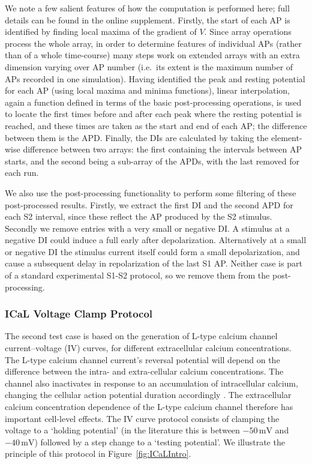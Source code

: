 \documentclass[preprint,authoryear,12pt]{elsarticle}
\newcommand{\vu}[2]{\ensuremath{#1\,\mathrm{#2}}}
\newcommand{\changed}[1]{#1}
\begin{document}
We note a few salient features of how the computation is performed here; full details can be found in the online supplement.
Firstly, the start of each AP is identified by finding local maxima of the gradient of $V$.
Since array operations process the whole array, in order to determine features of individual APs (rather than of a whole time-course) many steps work on extended arrays with an extra dimension varying over AP number (i.e.\ its extent is the maximum number of APs recorded in one simulation).
Having identified the peak and resting potential for each AP (using local maxima and minima functions), linear interpolation, again a function defined in terms of the basic post-processing operations, is used to locate the first times before and after each peak where the resting potential is reached, and these times are taken as the start and end of each AP; the difference between them is the APD.
Finally, the DIs are calculated by taking the element-wise difference between two arrays: the first containing the intervals between AP starts, and the second being a sub-array of the APDs, with the last removed for each run.


We also use the post-processing functionality to perform some filtering of these post-processed results.
Firstly, we extract the first DI and the second APD for each S2 interval, since these reflect the AP produced by the S2 stimulus.
\changed{Secondly we remove entries with a very small or negative DI.
A stimulus at a negative DI could induce a full early after depolarization.
Alternatively at a small or negative DI the stimulus current itself could form a small depolarization, and cause a subsequent delay in repolarization of the last S1 AP.
Neither case is part of a standard experimental S1-S2 protocol, so we remove them from the post-processing.}


\subsubsection{ICaL Voltage Clamp Protocol}
\label{sec:intro-ical}

The second test case is based on the generation of L-type calcium channel current--voltage (IV) curves, for different extracellular calcium concentrations.
The L-type calcium channel current's reversal potential will depend on the difference between the intra- and extra-cellular calcium concentrations.
The channel also inactivates in response to an accumulation of intracellular calcium, changing the cellular action potential duration accordingly \citep{grandi2009theoretical}.
The extracellular calcium concentration dependence of the L-type calcium channel therefore has important cell-level effects.
The IV curve protocol consists of clamping the voltage to a `holding potential' (in the literature this is between \vu{-50}{mV} and \vu{-40}{mV}) followed by a step change to a `testing potential'.
We illustrate the principle of this protocol in Figure~\ref{fig:ICaLIntro}.
\end{document}
